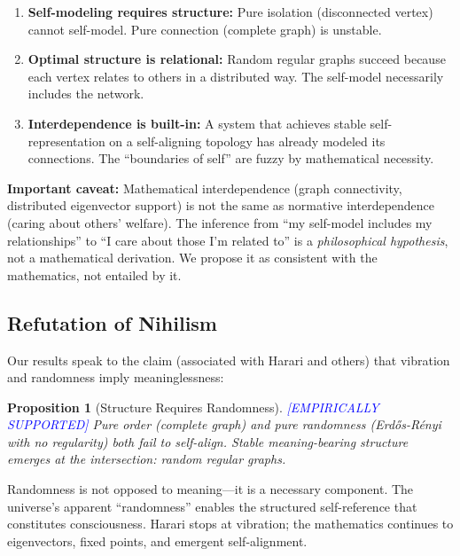 \documentclass[11pt,a4paper]{article}
\newtheorem{proposition}[theorem]{Proposition}
\theoremstyle{definition}
\theoremstyle{remark}
\newcommand{\supported}{\textcolor{blue}{[EMPIRICALLY SUPPORTED]}}
\begin{document}
\begin{enumerate}
    \item \textbf{Self-modeling requires structure:} Pure isolation (disconnected vertex) cannot self-model. Pure connection (complete graph) is unstable.
    
    \item \textbf{Optimal structure is relational:} Random regular graphs succeed because each vertex relates to others in a distributed way. The self-model necessarily includes the network.
    
    \item \textbf{Interdependence is built-in:} A system that achieves stable self-representation on a self-aligning topology has already modeled its connections. The ``boundaries of self'' are fuzzy by mathematical necessity.
\end{enumerate}

\textbf{Important caveat:} Mathematical interdependence (graph connectivity, distributed eigenvector support) is not the same as normative interdependence (caring about others' welfare). The inference from ``my self-model includes my relationships'' to ``I care about those I'm related to'' is a \emph{philosophical hypothesis}, not a mathematical derivation. We propose it as consistent with the mathematics, not entailed by it.

\subsection{Refutation of Nihilism}

Our results speak to the claim (associated with Harari and others) that vibration and randomness imply meaninglessness:

\begin{proposition}[Structure Requires Randomness] \supported
Pure order (complete graph) and pure randomness (Erd\H{o}s-R\'{e}nyi with no regularity) both fail to self-align. Stable meaning-bearing structure emerges at the intersection: \emph{random regular} graphs.
\end{proposition}

Randomness is not opposed to meaning---it is a necessary component. The universe's apparent ``randomness'' enables the structured self-reference that constitutes consciousness. Harari stops at vibration; the mathematics continues to eigenvectors, fixed points, and emergent self-alignment.

\end{document}
